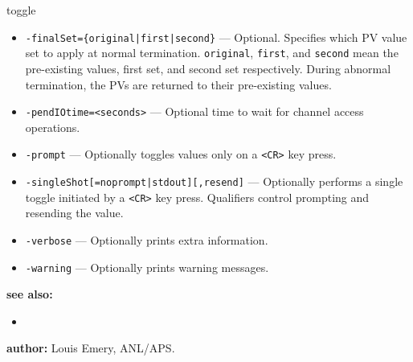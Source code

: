 \begin{sddsprog}{toggle}
\begin{itemize}
  \item {\tt -finalSet=\{original|first|second\}} --- Optional. Specifies which PV value set to apply at normal termination.
                 \verb+original+, \verb+first+, and \verb+second+ mean the pre-existing values, first set, and second set respectively.
                 During abnormal termination, the PVs are returned to their pre-existing values.
  \item {\tt -pendIOtime=<seconds>} --- Optional time to wait for channel access operations.
  \item {\tt -prompt} --- Optionally toggles values only on a \verb+<CR>+ key press.
  \item {\tt -singleShot[=noprompt|stdout][,resend]} --- Optionally performs a single toggle initiated by a \verb+<CR>+ key press. Qualifiers control prompting and resending the value.
  \item {\tt -verbose} --- Optionally prints extra information.
  \item {\tt -warning} --- Optionally prints warning messages.
\end{itemize}

\item \textbf{see also:}
\begin{itemize}
  \item {}
\end{itemize}
\item \textbf{author:} Louis Emery, ANL/APS.
\end{sddsprog}
